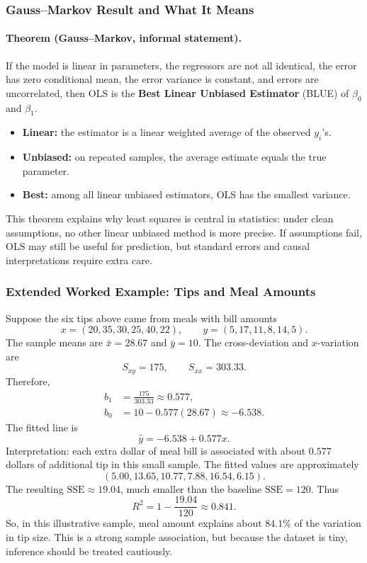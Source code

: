 \documentclass[12pt,openany]{book}
\begin{document}
\subsubsection{Gauss--Markov Result and What It Means}

\paragraph{Theorem (Gauss--Markov, informal statement).}
If the model is linear in parameters, the regressors are not all identical, the error has zero conditional mean, the error variance is constant, and errors are uncorrelated, then OLS is the \textbf{Best Linear Unbiased Estimator} (BLUE) of \(\beta_0\) and \(\beta_1\).

\begin{itemize}[leftmargin=*]
    \item \textbf{Linear:} the estimator is a linear weighted average of the observed \(y_i\)'s.
    \item \textbf{Unbiased:} on repeated samples, the average estimate equals the true parameter.
    \item \textbf{Best:} among all linear unbiased estimators, OLS has the smallest variance.
\end{itemize}

This theorem explains why least squares is central in statistics: under clean assumptions, no other linear unbiased method is more precise. If assumptions fail, OLS may still be useful for prediction, but standard errors and causal interpretations require extra care.

\subsubsection{Extended Worked Example: Tips and Meal Amounts}

Suppose the six tips above came from meals with bill amounts
\[
x=(20,35,30,25,40,22), \qquad y=(5,17,11,8,14,5).
\]
The sample means are \(\bar{x}=28.67\) and \(\bar{y}=10\). The cross-deviation and \(x\)-variation are
\[
S_{xy}=175, \qquad S_{xx}=303.33.
\]
Therefore,
\begin{align*}
b_1&=\frac{175}{303.33}\approx 0.577,\\
b_0&=10-0.577(28.67)\approx -6.538.
\end{align*}
The fitted line is
\[
\hat{y}=-6.538+0.577x.
\]
Interpretation: each extra dollar of meal bill is associated with about \(0.577\) dollars of additional tip in this small sample. The fitted values are approximately
\[
(5.00,13.65,10.77,7.88,16.54,6.15).
\]
The resulting \(\text{SSE}\approx 19.04\), much smaller than the baseline \(\text{SSE}=120\). Thus
\[
R^2=1-\frac{19.04}{120}\approx 0.841.
\]
So, in this illustrative sample, meal amount explains about \(84.1\%\) of the variation in tip size. This is a strong sample association, but because the dataset is tiny, inference should be treated cautiously.
\end{document}

